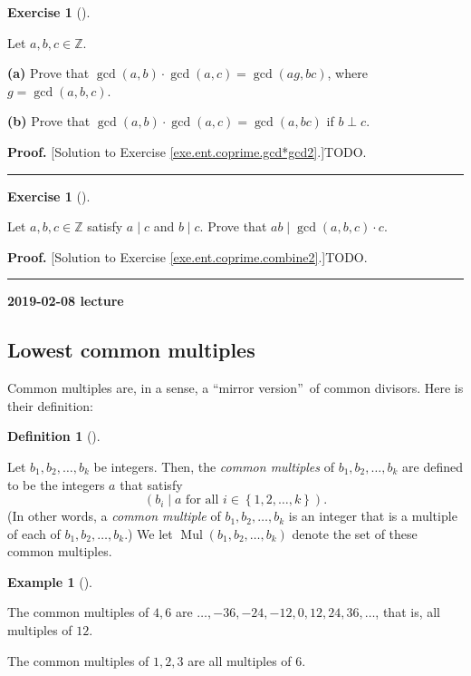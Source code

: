 \documentclass[numbers=enddot,12pt,final,onecolumn,notitlepage]{scrartcl}%
\newcounter{exer}
\numberwithin{exer}{subsection}
\theoremstyle{definition}
\newtheorem{defi}[theo]{Definition}
\newenvironment{definition}[1][]
{\begin{defi}[#1]\begin{leftbar}}
{\end{leftbar}\end{defi}}
\newtheorem{exam}[theo]{Example}
\newenvironment{example}[1][]
{\begin{exam}[#1]\begin{leftbar}}
{\end{leftbar}\end{exam}}
\newtheorem{exmp}[exer]{Exercise}
\newenvironment{exercise}[1][]
{\begin{exmp}[#1]\begin{leftbar}}
{\end{leftbar}\end{exmp}}
\newenvironment{proof}[1][Proof]{\noindent\textbf{#1.} }{\ \rule{0.5em}{0.5em}}
\begin{document}
\begin{exercise}
\label{exe.ent.coprime.gcd*gcd2}Let $a,b,c\in\mathbb{Z}$.

\textbf{(a)} Prove that $\gcd\left(  a,b\right)  \cdot\gcd\left(  a,c\right)
=\gcd\left(  ag,bc\right)  $, where $g=\gcd\left(  a,b,c\right)  $.

\textbf{(b)} Prove that $\gcd\left(  a,b\right)  \cdot\gcd\left(  a,c\right)
=\gcd\left(  a,bc\right)  $ if $b\perp c$.
\end{exercise}

\begin{proof}
[Solution to Exercise \ref{exe.ent.coprime.gcd*gcd2}.]TODO.
\end{proof}

\begin{exercise}
\label{exe.ent.coprime.combine2}Let $a,b,c\in\mathbb{Z}$ satisfy $a\mid c$ and
$b\mid c$. Prove that $ab\mid\gcd\left(  a,b,c\right)  \cdot c$.
\end{exercise}

\begin{proof}
[Solution to Exercise \ref{exe.ent.coprime.combine2}.]TODO.
\end{proof}

\begin{center}
\textbf{2019-02-08 lecture}
\end{center}

\subsection{Lowest common multiples}

Common multiples are, in a sense, a \textquotedblleft mirror
version\textquotedblright\ of common divisors. Here is their definition:

\begin{definition}
\label{def.ent.Mul}Let $b_{1},b_{2},\ldots,b_{k}$ be integers. Then, the
\textit{common multiples} of $b_{1},b_{2},\ldots,b_{k}$ are defined to be the
integers $a$ that satisfy%
\[
\left(  b_{i}\mid a\text{ for all }i\in\left\{  1,2,\ldots,k\right\}  \right)
.
\]
(In other words, a \textit{common multiple} of $b_{1},b_{2},\ldots,b_{k}$ is
an integer that is a multiple of each of $b_{1},b_{2},\ldots,b_{k}$.) We let
$\operatorname*{Mul}\left(  b_{1},b_{2},\ldots,b_{k}\right)  $ denote the set
of these common multiples.
\end{definition}

\begin{example}
The common multiples of $4,6$ are $\ldots,-36,-24,-12,0,12,24,36,\ldots$, that
is, all multiples of $12$.

The common multiples of $1,2,3$ are all multiples of $6$.
\end{example}
\end{document}

